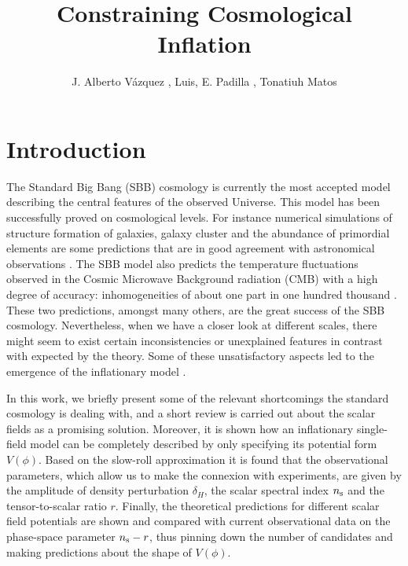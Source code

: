 \documentclass{rmaa}
\title{Constraining Cosmological Inflation}
\author{
J. Alberto V\'azquez \altaffilmark{1}, Luis, E. Padilla \altaffilmark{2,3}, Tonatiuh Matos \altaffilmark{2,3}}
\begin{document}

  \maketitle

\section{Introduction}

The Standard Big Bang (SBB) cosmology is currently the most accepted model describing 
the central features of the observed Universe. This model has been successfully proved on 
cosmological levels. For instance numerical simulations of structure formation of galaxies,
galaxy cluster and the abundance of primordial elements are some predictions that 
are in good agreement with astronomical observations \citep{Teg, Sping,Kolbbo}. 
The SBB model also predicts the temperature fluctuations observed in the Cosmic 
Microwave Background radiation (CMB) with a high degree of accuracy: 
inhomogeneities of about one part in one hundred thousand \citep{Komat,Planck} .
 These two predictions, amongst many others, are the great success of 
the SBB cosmology. Nevertheless, %
when we have a closer look at different scales, there might seem to exist certain 
inconsistencies or unexplained features in contrast   with expected by 
the theory. Some of these unsatisfactory aspects led to the 
emergence of the inflationary model \citep{Guth, Linde, Linde2, Steinhardt}.

In this work, we briefly present some of the relevant shortcomings the standard 
cosmology is dealing with, and a short review is carried out about the scalar fields as  a
promising solution. Moreover, it is shown how an inflationary single-field model can be 
completely described by only specifying its potential form $V(\phi)$. 
Based on the slow-roll approximation it is found that the observational parameters, 
which allow us to make the connexion with experiments, are given by 
the amplitude of density perturbation $\delta_H$, the scalar spectral index $n_{\rm s}$
and the tensor-to-scalar ratio $r$.
Finally, the theoretical predictions for different scalar field potentials are shown and 
compared with current observational data on the phase-space parameter $n_{\rm s}-r$, 
thus pinning down the number of candidates and making predictions about the shape of $V(\phi)$. 
\end{document}
